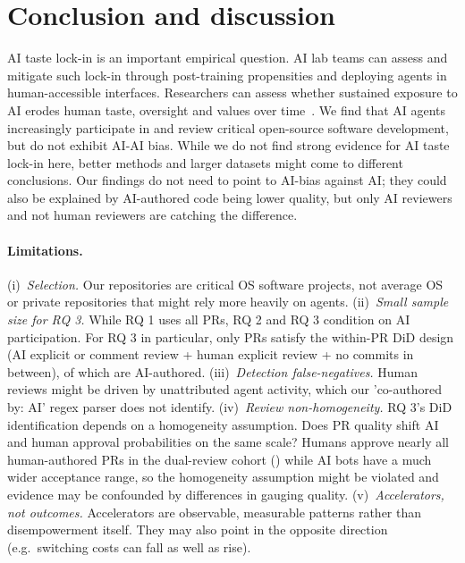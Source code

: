 \documentclass{article}
\begin{document}
\section{Conclusion and discussion}
\label{sec:discuss}

AI taste lock-in is an important empirical question. AI lab teams can assess and mitigate such lock-in through post-training propensities and deploying agents in human-accessible interfaces. Researchers can assess whether sustained exposure to AI erodes human taste, oversight and values over time~\citep{edelman2025fullstack}.
We find that AI agents increasingly participate in and review critical open-source software development, but do not exhibit AI-AI bias. While we do not find strong evidence for AI taste lock-in here, better methods and larger datasets might come to different conclusions. Our findings do not need to point to AI-bias against AI; they could also be explained by AI-authored code being lower quality, but only AI reviewers and not human reviewers are catching the difference.

\paragraph{Limitations.} (i)~\emph{Selection.} Our \PLACEHOLDERPRACTIVE{} repositories are critical OS software projects, not average OS or private repositories that might rely more heavily on agents.
(ii)~\emph{Small sample size for RQ 3.} While RQ 1 uses all \PLACEHOLDERNPRS{} PRs, RQ 2 and RQ 3 condition on AI participation. For RQ 3 in particular, only \PLACEHOLDERDIDN{} PRs satisfy the within-PR DiD design (AI explicit or comment review + human explicit review + no commits in between), of which \PLACEHOLDERDIDNAI{} are AI-authored.
(iii)~\emph{Detection false-negatives.} Human reviews might be driven by unattributed agent activity, which our 'co-authored by: AI' regex parser does not identify.
(iv)~\emph{Review non-homogeneity.} RQ 3's DiD identification depends on a homogeneity assumption. Does PR quality shift AI and human approval probabilities on the same scale? Humans approve nearly all human-authored PRs in the dual-review cohort (\PLACEHOLDERHAPPHRATE{}) while AI bots have a much wider acceptance range, so the homogeneity assumption might be violated and evidence may be confounded by differences in gauging quality.
(v)~\emph{Accelerators, not outcomes.} Accelerators are observable, measurable patterns rather than disempowerment itself. They may also point in the opposite direction (e.g.\ switching costs can fall as well as rise).
\end{document}
